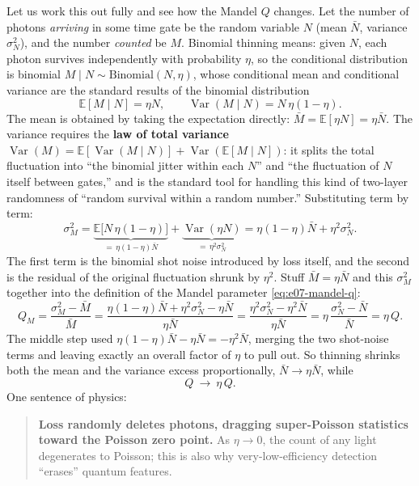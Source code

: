 Let us work this out fully and see how the Mandel \(Q\) changes. Let the number of photons \emph{arriving} in some time gate be the random variable \(N\) (mean \(\bar N\), variance \(\sigma_N^2\)), and the number \emph{counted} be \(M\). Binomial thinning means: given \(N\), each photon survives independently with probability \(\eta\), so the conditional distribution is binomial \(M\mid N\sim\mathrm{Binomial}(N,\eta)\), whose conditional mean and conditional variance are the standard results of the binomial distribution
\[
  \mathbb E[M\mid N]=\eta N,\qquad
  \operatorname{Var}(M\mid N)=N\,\eta(1-\eta).
\]
The mean is obtained by taking the expectation directly: \(\bar M=\mathbb E[\eta N]=\eta\bar N\). The variance requires the \textbf{law of total variance} \(\operatorname{Var}(M)=\mathbb E[\operatorname{Var}(M\mid N)]+\operatorname{Var}(\mathbb E[M\mid N])\): it splits the total fluctuation into ``the binomial jitter within each \(N\)'' and ``the fluctuation of \(N\) itself between gates,'' and is the standard tool for handling this kind of two-layer randomness of ``random survival within a random number.'' Substituting term by term:
\[
  \sigma_M^2
  =\underbrace{\mathbb E\big[N\,\eta(1-\eta)\big]}_{=\,\eta(1-\eta)\bar N}
  +\underbrace{\operatorname{Var}(\eta N)}_{=\,\eta^2\sigma_N^2}
  =\eta(1-\eta)\bar N+\eta^2\sigma_N^2 .
\]
The first term is the binomial shot noise introduced by loss itself, and the second is the residual of the original fluctuation shrunk by \(\eta^2\). Stuff \(\bar M=\eta\bar N\) and this \(\sigma_M^2\) together into the definition of the Mandel parameter \eqref{eq:e07-mandel-q}:
\[
  Q_M=\frac{\sigma_M^2-\bar M}{\bar M}
  =\frac{\eta(1-\eta)\bar N+\eta^2\sigma_N^2-\eta\bar N}{\eta\bar N}
  =\frac{\eta^2\sigma_N^2-\eta^2\bar N}{\eta\bar N}
  =\eta\,\frac{\sigma_N^2-\bar N}{\bar N}=\eta\,Q .
\]
The middle step used \(\eta(1-\eta)\bar N-\eta\bar N=-\eta^2\bar N\), merging the two shot-noise terms and leaving exactly an overall factor of \(\eta\) to pull out. So thinning shrinks both the mean and the variance excess proportionally, \(\bar N\to\eta\bar N\), while
\[
  Q\ \longrightarrow\ \eta\,Q .
\]
One sentence of physics:

\begin{quote}
\textbf{Loss randomly deletes photons, dragging super-Poisson statistics toward the Poisson zero point.} As \(\eta\to0\), the count of any light degenerates to Poisson; this is also why very-low-efficiency detection ``erases'' quantum features.
\end{quote}

